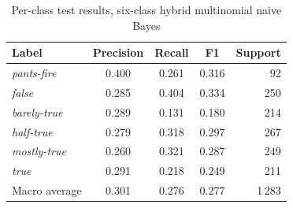 \begin{table}[t]
\caption{Per-class test results, six-class hybrid multinomial naive Bayes}
\label{tab:perclass}
\centering
\footnotesize
\begin{tabular}{@{}lcccr@{}}
\toprule
Label & Precision & Recall & F1 & Support \\
\midrule
\emph{pants-fire}  & 0.400 & 0.261 & 0.316 & 92 \\
\emph{false}       & 0.285 & 0.404 & 0.334 & 250 \\
\emph{barely-true} & 0.289 & 0.131 & 0.180 & 214 \\
\emph{half-true}   & 0.279 & 0.318 & 0.297 & 267 \\
\emph{mostly-true} & 0.260 & 0.321 & 0.287 & 249 \\
\emph{true}        & 0.291 & 0.218 & 0.249 & 211 \\
\midrule
Macro average      & 0.301 & 0.276 & 0.277 & 1\,283 \\
\bottomrule
\end{tabular}
\end{table}

